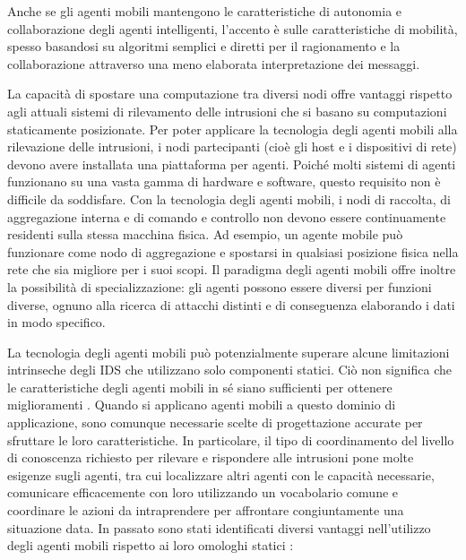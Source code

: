 Anche se gli agenti mobili mantengono le caratteristiche di autonomia e collaborazione degli agenti intelligenti, l'accento è sulle caratteristiche di mobilità, spesso basandosi su algoritmi semplici e diretti per il ragionamento e la collaborazione attraverso una meno elaborata interpretazione dei messaggi.


La capacità di spostare una computazione tra diversi nodi offre vantaggi rispetto agli attuali sistemi di rilevamento delle intrusioni che si basano su computazioni staticamente posizionate. Per poter applicare la tecnologia degli agenti mobili alla rilevazione delle intrusioni, i nodi partecipanti (cioè gli host e i dispositivi di rete) devono avere installata una piattaforma per agenti. Poiché molti sistemi di agenti funzionano su una vasta gamma di hardware e software, questo requisito non è difficile da soddisfare. Con la tecnologia degli agenti mobili, i nodi di raccolta, di aggregazione interna e di comando e controllo non devono essere continuamente residenti sulla stessa macchina fisica. Ad esempio, un agente mobile può funzionare come nodo di aggregazione e spostarsi in qualsiasi posizione fisica nella rete che sia migliore per i suoi scopi. Il paradigma degli agenti mobili offre inoltre la possibilità di specializzazione: gli agenti possono essere diversi per funzioni diverse, ognuno alla ricerca di attacchi distinti e di conseguenza elaborando i dati in modo specifico.


La tecnologia degli agenti mobili può potenzialmente superare alcune limitazioni intrinseche degli IDS  che utilizzano solo componenti statici. Ciò non significa che le caratteristiche degli agenti mobili in sé siano sufficienti per ottenere miglioramenti . Quando si applicano agenti mobili a questo dominio di applicazione, sono comunque necessarie scelte di progettazione accurate per sfruttare le loro caratteristiche. In particolare, il tipo di coordinamento del livello di conoscenza richiesto per rilevare e rispondere alle intrusioni pone molte esigenze sugli agenti, tra cui localizzare altri agenti con le capacità necessarie, comunicare efficacemente con loro utilizzando un vocabolario comune e coordinare le azioni da intraprendere per affrontare congiuntamente una situazione data. In passato sono stati identificati diversi vantaggi nell'utilizzo degli agenti mobili rispetto ai loro omologhi statici \cite{lange1998mobile,smith1988survey,vuong2011advanced}:

